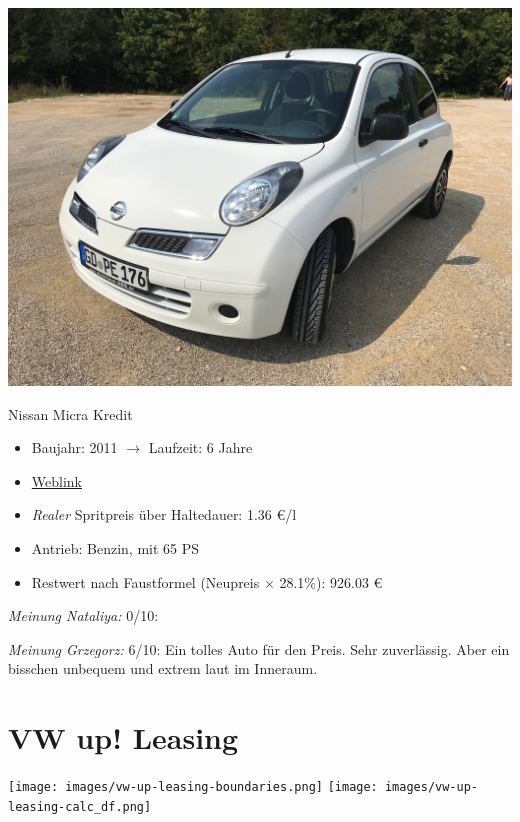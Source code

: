 \documentclass[landscape, DIV=99, 14pt]{scrartcl}
\begin{document}
\pagebreak
\begin{center}
\includegraphics[width=0.9\columnwidth]{cars/nissan-micra.jpg}

Nissan Micra Kredit
\end{center}

\begin{itemize}
    \item Baujahr: 2011 $\rightarrow$ Laufzeit: 6 Jahre
    \item \href{https://de.wikipedia.org/wiki/Nissan_Micra\#Micra_(K12,_2003%E2%80%932010)}{Weblink}
    \item \emph{Realer} Spritpreis \"uber Haltedauer: 1.36 \euro{}/l
    \item Antrieb: Benzin, mit 65 PS
    \item Restwert nach Faustformel (Neupreis $\times$ 28.1\%): 926.03 \euro{}
\end{itemize}

\begin{small}
\emph{Meinung Nataliya:} 0/10: 
        
\emph{Meinung Grzegorz:} 6/10: Ein tolles Auto f\"ur den Preis. Sehr zuverl\"assig. Aber ein bisschen unbequem und extrem laut im Inneraum.
\end{small}

\pagebreak


\twocolumn

\section*{VW up! Leasing}
\begin{center}
\texttt{[image: images/vw-up-leasing-boundaries.png]}
\null
\vspace{0.5cm}
\texttt{[image: images/vw-up-leasing-calc\_df.png]}
\end{center}
\end{document}
